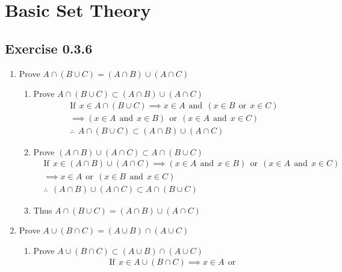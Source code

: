 \chapter*{Basic Set Theory}
\section*{Exercise 0.3.6}
  \begin{enumerate}
    \item Prove $A \cap (B \cup C) = (A \cap B) \cup (A \cap C)$
    \begin{enumerate}
      \item Prove $A \cap (B \cup C) \subset (A \cap B) \cup (A \cap C)$
      \begin{align*}
        \nonumber
        &\text{If}\ \ x \in A \cap (B \cup C) \implies x \in A \ \ \text{and}\ \ 
        (x \in B \ \ \text{or} \ \ x \in C) \\
        \nonumber
        &\implies (x \in A \ \ \text{and} \ \ x \in B) \ \ \text{or} \ \ 
        (x \in A \ \ \text{and} \ \ x \in C) \\
        \nonumber
        &\therefore \ \ A \cap (B \cup C) \subset (A \cap B) \cup (A \cap C)
      \end{align*}
      \item Prove $(A \cap B) \cup (A \cap C) \subset A \cap (B \cup C)$
      \begin{align*}
        \nonumber
        &\text{If}\ \ x \in (A \cap B) \cup (A \cap C) \implies
        (x \in A \ \ \text{and} \ \ x \in B)\ \ \text{or} \ \ 
        (x \in A \ \ \text{and} \ \ x \in C) \\
        \nonumber
        &\implies x \in A \ \ \text{or} \ \ 
        (x \in B \ \ \text{and} \ \ x \in C) \\
        \nonumber
        &\therefore \ \ (A \cap B) \cup (A \cap C) \subset A \cap (B \cup C)
      \end{align*}
      \item Thus $A \cap (B \cup C) = (A \cap B) \cup (A \cap C)$ \qedsymbol{}
    \end{enumerate}
    \item Prove $A \cup (B \cap C) = (A \cup B) \cap (A \cup C)$ \\
    \begin{enumerate}
      \item Prove $A \cup (B \cap C) \subset (A \cup B) \cap (A \cup C)$
      \begin{align*}
        &\text{If}\ \ x \in A \cup (B \cap C) \implies x \in A \ \ \text{or} \ \ 

\end{align*}
\end{enumerate}
\end{enumerate}
